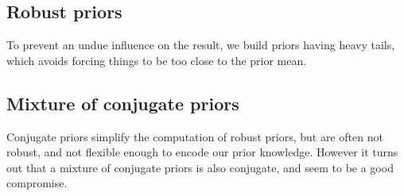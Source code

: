 \subsection{Robust priors}
To prevent an undue influence on the result, we build priors having heavy tails, which 
avoids forcing things to be too close to the prior mean.

\subsection{Mixture of conjugate priors}
Conjugate priors simplify the computation of robust priors, but are often not robust, and 
not flexible enough to encode our prior knowledge. However it turns out that a mixture of
conjugate priors is also conjugate, and seem to be a good compromise.

